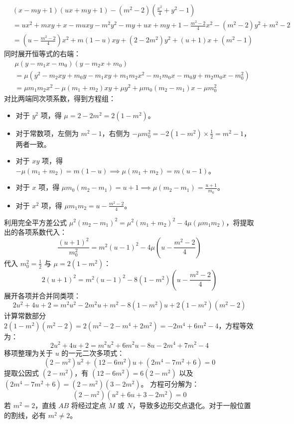 \begin{solution}
\begin{align*}
& (x - my + 1)(ux + my + 1) - (m^2 - 2)\left(\frac{x^2}{4} + y^2 - 1\right) \\
&= u x^2 + m xy + x - mu xy - m^2 y^2 - my + ux + my + 1 - \frac{m^2 - 2}{4} x^2 - (m^2 - 2)y^2 + m^2 - 2 \\
&= \left(u - \frac{m^2 - 2}{4}\right) x^2 + m(1 - u) xy + (2 - 2m^2) y^2 + (u + 1)x + (m^2 - 1)
\end{align*}
同时展开恒等式的右端：
\begin{align*}
& \mu(y - m_1 x - m_0)(y - m_2 x + m_0) \\
&= \mu \left( y^2 - m_2 xy + m_0 y - m_1 xy + m_1 m_2 x^2 - m_1 m_0 x - m_0 y + m_2 m_0 x - m_0^2 \right) \\
&= \mu m_1 m_2 x^2 - \mu(m_1 + m_2) xy + \mu y^2 + \mu m_0(m_2 - m_1)x - \mu m_0^2
\end{align*}
对比两端同次项系数，得到方程组：
\begin{itemize}
\item 对于 $y^2$ 项，得 $\mu = 2 - 2m^2 = 2(1 - m^2)$。
\item 对于常数项，左侧为 $m^2 - 1$，右侧为 $-\mu m_0^2 = -2(1 - m^2) \times \frac{1}{2} = m^2 - 1$，两者一致。
\item 对于 $xy$ 项，得 $-\mu(m_1 + m_2) = m(1 - u) \implies \mu(m_1 + m_2) = m(u - 1)$。
\item 对于 $x$ 项，得 $\mu m_0(m_2 - m_1) = u + 1 \implies \mu(m_2 - m_1) = \frac{u + 1}{m_0}$。
\item 对于 $x^2$ 项，得 $\mu m_1 m_2 = u - \frac{m^2 - 2}{4}$。
\end{itemize}
利用完全平方差公式 $\mu^2 (m_2 - m_1)^2 = \mu^2 (m_1 + m_2)^2 - 4\mu(\mu m_1 m_2)$，将提取出的各项系数代入：
$$ \frac{(u + 1)^2}{m_0^2} = m^2 (u - 1)^2 - 4\mu \left(u - \frac{m^2 - 2}{4}\right) $$
代入 $m_0^2 = \frac{1}{2}$ 与 $\mu = 2(1 - m^2)$：
$$ 2(u + 1)^2 = m^2 (u - 1)^2 - 8(1 - m^2)\left(u - \frac{m^2 - 2}{4}\right) $$
展开各项并合并同类项：
$$ 2u^2 + 4u + 2 = m^2 u^2 - 2m^2 u + m^2 - 8(1 - m^2)u + 2(1 - m^2)(m^2 - 2) $$
计算常数部分 $2(1 - m^2)(m^2 - 2) = 2(m^2 - 2 - m^4 + 2m^2) = -2m^4 + 6m^2 - 4$，方程等效为：
$$ 2u^2 + 4u + 2 = m^2 u^2 + 6m^2 u - 8u - 2m^4 + 7m^2 - 4 $$
移项整理为关于 $u$ 的一元二次多项式：
$$ (2 - m^2)u^2 + (12 - 6m^2)u + (2m^4 - 7m^2 + 6) = 0 $$
提取公因式 $(2 - m^2)$，有 $(12 - 6m^2) = 6(2 - m^2)$ 以及 $(2m^4 - 7m^2 + 6) = (2 - m^2)(3 - 2m^2)$。
方程可分解为：
$$ (2 - m^2)(u^2 + 6u + 3 - 2m^2) = 0 $$
若 $m^2 = 2$，直线 $AB$ 将经过定点 $M$ 或 $N$，导致多边形交点退化。对于一般位置的割线，必有 $m^2 \neq 2$。

\end{solution}
